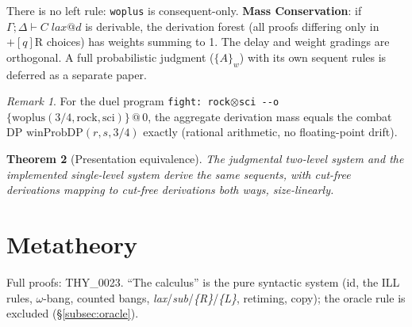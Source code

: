 \documentclass[11pt]{article}
\makeatletter
\newcommand{\lax}[2]{\{#1\}\mathbin{@}#2}       %
\newcommand{\tensor}{\otimes}                    %
\newcommand{\laxjdg}[1]{\;\mathit{lax}@{#1}}    %
\newcommand{\wop}[1]{+[{#1}]}                   %
\newtheorem{theorem}{Theorem}[section]
\theoremstyle{definition}
\theoremstyle{remark}
\newtheorem{remark}[theorem]{Remark}
\makeatother
\begin{document}
There is no left rule: \texttt{woplus} is consequent-only.  \textbf{Mass
Conservation}: if $\Gamma;\Delta \vdash C\laxjdg{d}$ is derivable, the derivation
forest (all proofs differing only in $\wop{q}$R choices) has weights summing to
1.  The delay and weight gradings are orthogonal.  A full probabilistic judgment
($\{A\}_w$) with its own sequent rules is deferred as a separate paper.

\begin{remark}
For the duel program \texttt{fight: rock}$\tensor$\texttt{sci -{}-o}
$\lax{\text{woplus}(3/4,\text{rock},\text{sci})}{0}$, the aggregate derivation
mass equals the combat DP $\mathrm{winProbDP}(r,s,3/4)$ exactly (rational
arithmetic, no floating-point drift).
\end{remark}

\begin{theorem}[Presentation equivalence]
\label{thm:pres-equiv}
The judgmental two-level system and the implemented single-level system derive the
same sequents, with cut-free derivations mapping to cut-free derivations both ways,
size-linearly.
\end{theorem}

\section{Metatheory}
\label{sec:meta}

Full proofs: THY\_0023.  ``The calculus'' is the pure syntactic system (id, the
ILL rules, $\omega$-bang, counted bangs,
\textit{lax}/\textit{sub}/\textit{\{R\}}/\textit{\{L\}}, retiming, copy); the
oracle rule is excluded (\S\ref{subsec:oracle}).
\end{document}
